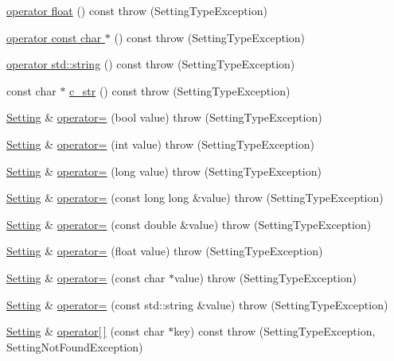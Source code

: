 \begin{DoxyCompactItemize}
\hyperlink{classlibconfig_1_1_setting_afe1936d947131f08bc0b0e0824ada07a}{operator float} () const   throw (SettingTypeException)
\item 
\hyperlink{classlibconfig_1_1_setting_aaec2d0eca01cca2974dcf32c7246d80f}{operator const char $\ast$} () const   throw (SettingTypeException)
\item 
\hyperlink{classlibconfig_1_1_setting_aec0236d3c1a6d3626b0e46c84dd6fee7}{operator std::string} () const   throw (SettingTypeException)
\item 
const char $\ast$ \hyperlink{classlibconfig_1_1_setting_a34a7bdb5b70b200ea070db5f0918f0f0}{c\_\-str} () const   throw (SettingTypeException)
\item 
\hyperlink{classlibconfig_1_1_setting}{Setting} \& \hyperlink{classlibconfig_1_1_setting_aaa35268d7f5b451a3fd853a41e4ce60a}{operator=} (bool value)  throw (SettingTypeException)
\item 
\hyperlink{classlibconfig_1_1_setting}{Setting} \& \hyperlink{classlibconfig_1_1_setting_ad466b44815dfe9ae2177765d2242911a}{operator=} (int value)  throw (SettingTypeException)
\item 
\hyperlink{classlibconfig_1_1_setting}{Setting} \& \hyperlink{classlibconfig_1_1_setting_a4caadef35e5cee2d9a8f659c31786a65}{operator=} (long value)  throw (SettingTypeException)
\item 
\hyperlink{classlibconfig_1_1_setting}{Setting} \& \hyperlink{classlibconfig_1_1_setting_a25baf662804c2847b00d9e1f7ca5cde5}{operator=} (const long long \&value)  throw (SettingTypeException)
\item 
\hyperlink{classlibconfig_1_1_setting}{Setting} \& \hyperlink{classlibconfig_1_1_setting_a7488663acd784d99bc0c9b2daac9a941}{operator=} (const double \&value)  throw (SettingTypeException)
\item 
\hyperlink{classlibconfig_1_1_setting}{Setting} \& \hyperlink{classlibconfig_1_1_setting_af15ab13df839c6a45231a1af1eda8163}{operator=} (float value)  throw (SettingTypeException)
\item 
\hyperlink{classlibconfig_1_1_setting}{Setting} \& \hyperlink{classlibconfig_1_1_setting_a74867e0937b039a73e1ee58e2b6e25c8}{operator=} (const char $\ast$value)  throw (SettingTypeException)
\item 
\hyperlink{classlibconfig_1_1_setting}{Setting} \& \hyperlink{classlibconfig_1_1_setting_af7ed1af6a57ef12c20ef91c441642a34}{operator=} (const std::string \&value)  throw (SettingTypeException)
\item 
\hyperlink{classlibconfig_1_1_setting}{Setting} \& \hyperlink{classlibconfig_1_1_setting_a21d11b7fb846888e0aee832e081b622d}{operator\mbox{[}$\,$\mbox{]}} (const char $\ast$key) const   throw (SettingTypeException, SettingNotFoundException)

\end{DoxyCompactItemize}
